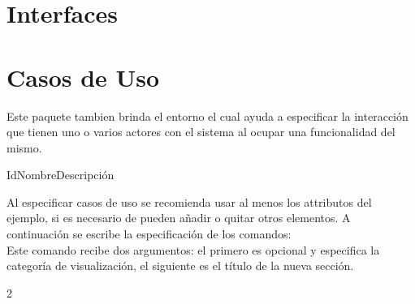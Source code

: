 \section{Interfaces}

\clearpage
\section{Casos de Uso}

Este paquete tambien brinda el entorno  el cual ayuda a especificar la interacción que tienen uno o varios actores con el sistema al ocupar una funcionalidad del mismo.

    \begin{code}
\begin{UseCase}{Id}{Nombre}{Descripción}


    
    
    
    
    
\end{UseCase}
    \end{code}
    
\noindent Al especificar casos de uso se recomienda usar al menos los attributos del ejemplo, si es necesario de pueden añadir o quitar otros elementos. A continuación se escribe la especificación de los comandos:\\
    
 Este comando recibe dos argumentos: el primero es opcional y especifica la categoría de visualización, el siguiente es el título de la nueva sección.
    
    \begin{multicols}{2}
    \begin{code}
    \end{code}
    \columnbreak
    \begin{code}
    \end{code}
    \end{multicols}
    

